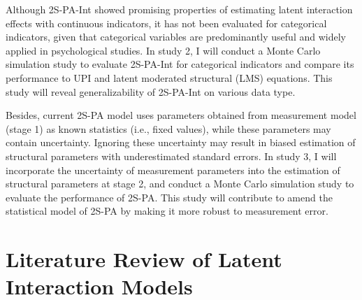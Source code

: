 \documentclass[
  11pt,
  man]{apa6}
\begin{document}
Although 2S-PA-Int showed promising properties of estimating latent interaction effects with continuous indicators, it has not been evaluated for categorical indicators, given that categorical variables are predominantly useful and widely applied in psychological studies. In study 2, I will conduct a Monte Carlo simulation study to evaluate 2S-PA-Int for categorical indicators and compare its performance to UPI and latent moderated structural (LMS) equations. This study will reveal generalizability of 2S-PA-Int on various data type.

Besides, current 2S-PA model uses parameters obtained from measurement model (stage 1) as known statistics (i.e., fixed values), while these parameters may contain uncertainty. Ignoring these uncertainty may result in biased estimation of structural parameters with underestimated standard errors. In study 3, I will incorporate the uncertainty of measurement parameters into the estimation of structural parameters at stage 2, and conduct a Monte Carlo simulation study to evaluate the performance of 2S-PA. This study will contribute to amend the statistical model of 2S-PA by making it more robust to measurement error.


\newpage

\centering
\raggedright
\newpage
\tableofcontents

\newpage

\setlength{\parindent}{0.5in}

\hypertarget{literature-review-of-latent-interaction-models}{%
\section{Literature Review of Latent Interaction Models}\label{literature-review-of-latent-interaction-models}}
\end{document}

